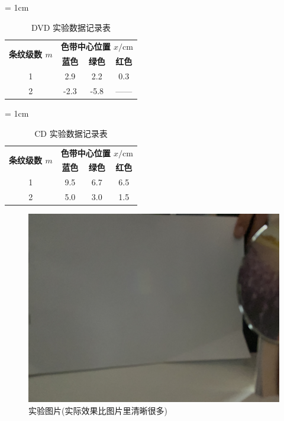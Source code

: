 \documentclass[fontset=windows]{article}
\begin{document}
\begin{table}[htbp]
    \centering
    \caption{DVD 实验数据记录表}
    \label{table1}
    \renewcommand\arraystretch{1.5}
    \tabcolsep = 1cm
    \begin{tabular}{|c|c|c|c|}
        \hline
        \multirow{2}{*}{\textbf{条纹级数 $m$}} & \multicolumn{3}{|c|}{\textbf{色带中心位置 $x/\mathrm{cm}$}}\\
        \cline{2-4} %
        & \textbf{蓝色} & \textbf{绿色} & \textbf{红色} \\
        \hline
        1 & 2.9 & 2.2 & 0.3 \\
        \hline
        2 & -2.3 & -5.8 & —— \\
        \hline
    \end{tabular}
\end{table}

\begin{table}[htbp]
    \centering
    \caption{CD 实验数据记录表}
    \label{table2}
    \renewcommand\arraystretch{1.5}
    \tabcolsep = 1cm
    \begin{tabular}{|c|c|c|c|}
        \hline
        \multirow{2}{*}{\textbf{条纹级数 $m$}} & \multicolumn{3}{|c|}{\textbf{色带中心位置 $x/\mathrm{cm}$}}\\
        \cline{2-4} %
        & \textbf{蓝色} & \textbf{绿色} & \textbf{红色} \\
        \hline
        1 & 9.5 & 6.7 & 6.5 \\
        \hline
        2 & 5.0 & 3.0 & 1.5 \\
        \hline
    \end{tabular}
\end{table}

\begin{figure}[htbp]
	\centering
	\includegraphics[scale=0.07]{1.jpg}
	\caption{ 实验图片(实际效果比图片里清晰很多) }
	\label{6}
\end{figure}
\end{document}
